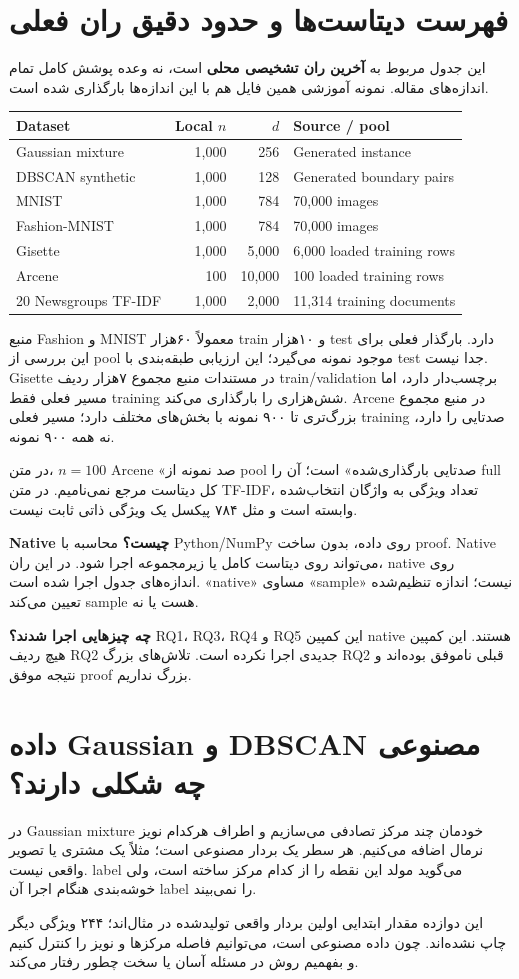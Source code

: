 \documentclass[11pt,a4paper]{article}
\newcommand{\lesson}[1]{\clearpage\section{#1}}
\newcommand{\codefile}[1]{\begin{latin}\end{latin}}
\begin{document}
\lesson{فهرست دیتاست‌ها و حدود دقیق ران فعلی}
این جدول مربوط به \textbf{آخرین ران تشخیصی محلی} است، نه وعده پوشش کامل تمام اندازه‌های مقاله. نمونه آموزشی همین فایل هم با این اندازه‌ها بارگذاری شده است.
\begin{latin}\begin{center}\small
\begin{tabular}{lrrl}
\toprule Dataset & Local \(n\) & \(d\) & Source / pool \\\midrule
Gaussian mixture & 1,000 & 256 & Generated instance \\
DBSCAN synthetic & 1,000 & 128 & Generated boundary pairs \\
MNIST & 1,000 & 784 & 70,000 images \\
Fashion-MNIST & 1,000 & 784 & 70,000 images \\
Gisette & 1,000 & 5,000 & 6,000 loaded training rows \\
Arcene & 100 & 10,000 & 100 loaded training rows \\
20 Newsgroups TF-IDF & 1,000 & 2,000 & 11,314 training documents \\
\bottomrule\end{tabular}\end{center}\end{latin}
منبع Fashion و MNIST معمولاً ۶۰هزار train و ۱۰هزار test دارد. بارگذار فعلی برای این بررسی از pool موجود نمونه می‌گیرد؛ این ارزیابی طبقه‌بندی با test جدا نیست. Gisette در مستندات منبع مجموع ۷هزار ردیف train/validation برچسب‌دار دارد، اما مسیر فعلی فقط training شش‌هزاری را بارگذاری می‌کند. Arcene در منبع مجموع بزرگ‌تری تا ۹۰۰ نمونه با بخش‌های مختلف دارد؛ مسیر فعلی training صدتایی را دارد، نه همه ۹۰۰ نمونه.

در متن، \(n=100\) Arcene «صد نمونه از pool صدتایی بارگذاری‌شده» است؛ آن را full کل دیتاست مرجع نمی‌نامیم. در متن TF-IDF، تعداد ویژگی به واژگان انتخاب‌شده وابسته است و مثل ۷۸۴ پیکسل یک ویژگی ذاتی ثابت نیست.

\textbf{Native چیست؟} محاسبه با Python/NumPy روی داده، بدون ساخت proof. Native می‌تواند روی دیتاست کامل یا زیرمجموعه اجرا شود. در این ران، native روی اندازه‌های جدول اجرا شده است. «native» مساوی «sample» نیست؛ اندازه تنظیم‌شده تعیین می‌کند sample هست یا نه.

\textbf{چه چیزهایی اجرا شدند؟} RQ1، RQ3، RQ4 و RQ5 این کمپین native هستند. این کمپین هیچ ردیف RQ2 جدیدی اجرا نکرده است. تلاش‌های بزرگ RQ2 قبلی ناموفق بوده‌اند و نتیجه موفق proof بزرگ نداریم.

\lesson{داده Gaussian و DBSCAN مصنوعی چه شکلی دارند؟}
در Gaussian mixture خودمان چند مرکز تصادفی می‌سازیم و اطراف هرکدام نویز نرمال اضافه می‌کنیم. هر سطر یک بردار مصنوعی است؛ مثلاً یک مشتری یا تصویر واقعی نیست. label می‌گوید مولد این نقطه را از کدام مرکز ساخته است، ولی خوشه‌بندی هنگام اجرا آن label را نمی‌بیند.
\codefile{gaussian_mixture_sample.txt}
این دوازده مقدار ابتدایی اولین بردار واقعی تولیدشده در مثال‌اند؛ ۲۴۴ ویژگی دیگر چاپ نشده‌اند. چون داده مصنوعی است، می‌توانیم فاصله مرکزها و نویز را کنترل کنیم و بفهمیم روش در مسئله آسان یا سخت چطور رفتار می‌کند.
\end{document}

